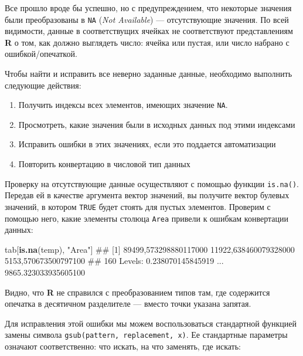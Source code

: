 \documentclass[]{book}
\newenvironment{Shaded}{\begin{snugshade}}{\end{snugshade}}
\newcommand{\KeywordTok}[1]{\textcolor[rgb]{0.13,0.29,0.53}{\textbf{#1}}}
\newcommand{\StringTok}[1]{\textcolor[rgb]{0.31,0.60,0.02}{#1}}
\newcommand{\NormalTok}[1]{#1}
\providecommand{\tightlist}{%
  \setlength{\itemsep}{0pt}\setlength{\parskip}{0pt}}
\begin{document}
Все прошло вроде бы успешно, но с предупреждением, что некоторые
значения были преобразованы в \texttt{NA} (\emph{Not Available}) ---
отсутствующие значения. По всей видимости, данные в соответствущих
ячейках не соответствуют представлениям \textbf{R} о том, как должно
выглядеть число: ячейка или пустая, или число набрано с
ошибкой/опечаткой.

Чтобы найти и исправить все неверно заданные данные, необходимо
выполнить следующие действия:

\begin{enumerate}
\def\labelenumi{\arabic{enumi}.}
\tightlist
\item
  Получить индексы всех элементов, имеющих значение \texttt{NA}.
\item
  Просмотреть, какие значения были в исходных данных под этими индексами
\item
  Исправить ошибки в этих значениях, если это поддается автоматизации
\item
  Повторить конвертацию в числовой тип данных
\end{enumerate}

Проверку на отсутствующие данные осуществляют с помощью функции
\texttt{is.na()}. Передав ей в качестве аргумента вектор значений, вы
получите вектор булевых значений, в котором \texttt{TRUE} будет стоять
для пустых элементов. Проверим с помощью него, какие элементы столюца
\texttt{Area} привели к ошибкам конвертации данных:

\begin{Shaded}
\begin{Highlighting}[]
\NormalTok{tab[}\KeywordTok{is.na}\NormalTok{(temp), }\StringTok{"Area"}\NormalTok{]}
\NormalTok{## [1] 89499,573298880117000 11922,638460079328000 5153,570673500797100 }
\NormalTok{## 160 Levels: 0.238070145845919 ... 9865.323033935605100}
\end{Highlighting}
\end{Shaded}

Видно, что \textbf{R} не справился с преобразованием типов там, где
содержится опечатка в десятичном разделителе --- вместо точки указана
запятая.

Для исправления этой ошибки мы можем воспользоваться стандартной
функцией замены символа \texttt{gsub(pattern,\ replacement,\ x)}. Ее
стандартные параметры означают соответственно: что искать, на что
заменять, где искать:
\end{document}

